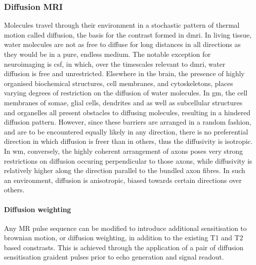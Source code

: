 \subsubsection{Diffusion MRI}


Molecules travel through their environment in a stochastic pattern of thermal motion called diffusion, the basis for the contrast formed in \gls{dmri}. 
In living tissue, water molecules are not as free to diffuse for long distances in all directions as they would be in a pure, endless medium.
The notable exception for neuroimaging is \gls{csf}, in which, over the timescales relevant to \gls{dmri}, water diffusion is free and unrestricted. 
Elsewhere in the brain, the presence of highly organised biochemical structures, cell membranes, and cytoskeletons, places varying degrees of restriction  on the diffusion of water molecules.
In \gls{gm}, the cell membranes of somae, glial cells, dendrites and  as well as subcellular structures and organelles all present obstacles to diffusing molecules, resulting in a hindered diffusion pattern.
However, since these barriers are arranged in a random fashion, and are to be encountered equally likely in any direction, there is no preferential direction in which diffusion is freer than in others, thus the diffusivity is isotropic.
In \gls{wm}, conversely, the highly coherent arrangement of axons poses very strong restrictions on diffusion occuring perpendicular to those axons, while diffusivity is relatively higher along the direction parallel to the bundled axon fibres.
In such an environment, diffusion is anisotropic, biased towards certain directions over others.

\paragraph{Diffusion weighting}

Any MR pulse sequence can be modified to introduce additional sensitisation to brownian motion, or diffusion weighting, in addition to the existing T1 and T2 based constrasts.
This is achieved through the application of a pair of diffusion sensitisation graident pulses prior to echo generation and signal readout.

